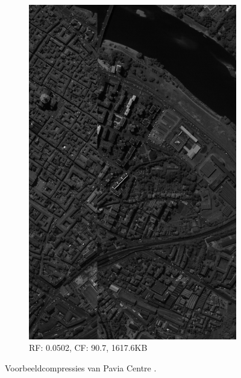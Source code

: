 \begin{figure}[]
\centering
\ContinuedFloat
\begin{subfigure}{\textwidth}
  \centering
  \includegraphics[width=0.85\linewidth]{images/example_compression_Pavia_Centre_0_05.png}
  \caption{RF: 0.0502, CF: 90.7, 1617.6KB}
\end{subfigure}
\caption{Voorbeeldcompressies van Pavia Centre \cite{ref:ehu_rosis}.}
\end{figure}

